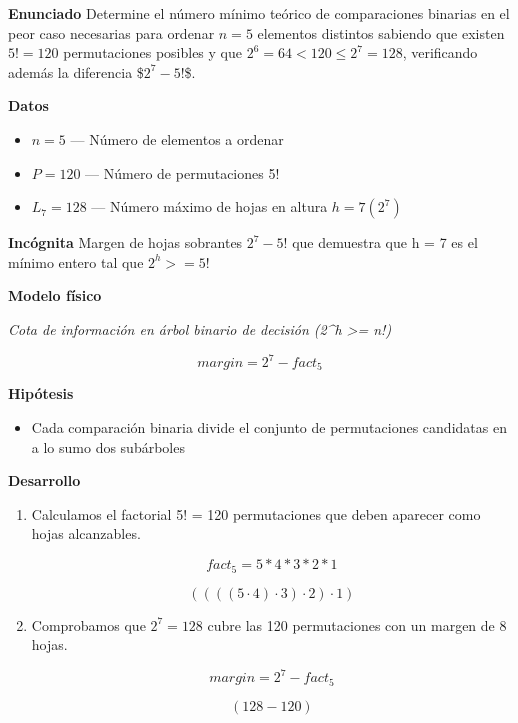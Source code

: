\documentclass{book}
\begin{document}
\begin{tcolorbox}[title={Problema resuelto}, studiumworked, breakable]

\noindent\textbf{Enunciado}
Determine el número mínimo teórico de comparaciones binarias en el peor caso necesarias para ordenar \(n = 5\) elementos distintos sabiendo que existen \(5! = 120\) permutaciones posibles y que \(2^6 = 64 < 120 \le 2^7 = 128\), verificando además la diferencia \$\(2^7 - 5\)!\$.

\noindent\textbf{Datos}
\begin{itemize}
\item $n = 5$ — Número de elementos a ordenar
\item $P = 120$ — Número de permutaciones 5!
\item $L_{7} = 128$ — Número máximo de hojas en altura \(h = 7 (2^7)\)
\end{itemize}

\noindent\textbf{Incógnita}
Margen de hojas sobrantes \(2^7 - 5\)! que demuestra que h = 7 es el mínimo entero tal que \(2^h >= 5\)!

\noindent\textbf{Modelo físico}

\noindent\textit{Cota de información en árbol binario de decisión (2\textasciicircum{}h >= n!)}

\[
margin = 2^7 - fact_5
\]

\noindent\textbf{Hipótesis}
\begin{itemize}
\item Cada comparación binaria divide el conjunto de permutaciones candidatas en a lo sumo dos subárboles
\end{itemize}

\noindent\textbf{Desarrollo}
\begin{enumerate}
\item
Calculamos el factorial 5! = 120 permutaciones que deben aparecer como hojas alcanzables.

\[
fact_5 = 5 * 4 * 3 * 2 * 1
\]

\[
\left(\left(\left(\left(5\cdot 4\right)\cdot 3\right)\cdot 2\right)\cdot 1\right)
\]
\item
Comprobamos que \(2^7 = 128\) cubre las 120 permutaciones con un margen de 8 hojas.

\[
margin = 2^7 - fact_5
\]

\[
\left(128-120\right)
\]
\end{enumerate}


\end{tcolorbox}
\end{document}
